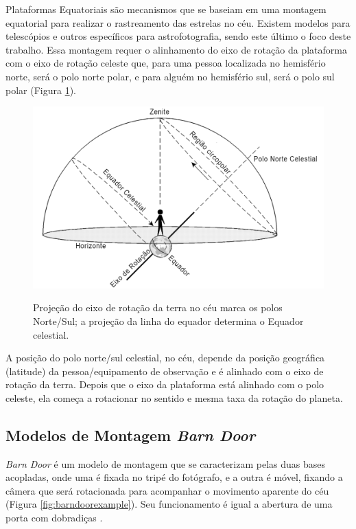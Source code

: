 Plataformas Equatoriais são mecanismos que se baseiam em uma montagem equatorial para realizar o rastreamento das estrelas no céu. Existem modelos para telescópios e outros específicos para astrofotografia, sendo este último o foco deste trabalho. Essa montagem requer o alinhamento do eixo de rotação da plataforma com o eixo de rotação celeste que, para uma pessoa localizada no hemisfério norte, será o polo norte polar, e para alguém no hemisfério sul, será o polo sul polar (Figura \ref{fig:celestialchart}). 

\begin{figure}[!htb]
	\centering
	\caption{Projeção do eixo de rotação da terra no céu marca os polos Norte/Sul; a projeção da linha do equador determina o Equador celestial.}
	\includegraphics[width=0.8\linewidth]{figuras/revisaobiblio/celestialchart}
	\label{fig:celestialchart}
\end{figure}

A posição do polo norte/sul celestial, no céu, depende da posição geográfica (latitude) da pessoa/equipamento de observação e é alinhado com o eixo de rotação da terra. Depois que o eixo da plataforma está alinhado com o polo celeste, ela começa a rotacionar no sentido e mesma taxa da rotação do planeta.

\subsection[Modelos de Montagem]{Modelos de Montagem \textit{Barn Door}}
\textit{Barn Door} é um modelo de montagem que se caracterizam pelas duas bases acopladas, onde uma é fixada no tripé do fotógrafo, e a outra é móvel, fixando a câmera que será rotacionada para acompanhar o movimento aparente do céu (Figura \ref{fig:barndoorexample}). Seu funcionamento é igual a abertura de uma porta com dobradiças \cite{site:pentaxBarnDoor}. 

